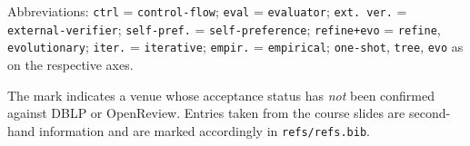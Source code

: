 \vspace{2pt}
{\footnotesize
Abbreviations: \texttt{ctrl} = \texttt{control-flow}; \texttt{eval} =
\texttt{evaluator}; \texttt{ext.\ ver.} = \texttt{external-verifier};
\texttt{self-pref.} = \texttt{self-preference};
\texttt{refine+evo} = \texttt{refine}, \texttt{evolutionary};
\texttt{iter.} = \texttt{iterative}; \texttt{empir.} = \texttt{empirical};
\texttt{one-shot}, \texttt{tree}, \texttt{evo} as on the respective axes.

The mark \unverified indicates a venue whose acceptance status has \emph{not} been
confirmed against DBLP or OpenReview. Entries taken from the course slides are
second-hand information and are marked accordingly in \texttt{refs/refs.bib}.
}
